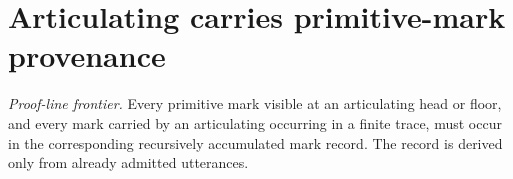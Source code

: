 \section{Articulating carries primitive-mark provenance}

\begin{theorem}\label{thm:articulating-mark-provenance}\notready{}
\emph{Proof-line frontier.} Every primitive mark visible at an articulating head or floor, and every mark carried by an articulating occurring in a finite trace, must occur in the corresponding recursively accumulated mark record. The record is derived only from already admitted utterances.
\end{theorem}
